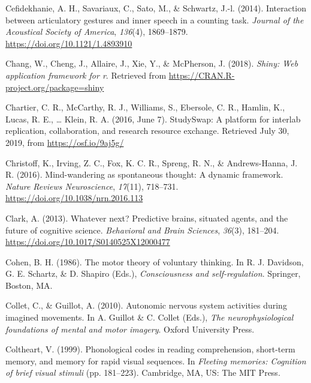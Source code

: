 \documentclass[a4paper,12pt,twoside,onecolumn,openright,final,oldfontcommands]{memoir}
\begin{document}
\leavevmode\hypertarget{ref-cefidekhanie_interaction_2014}{}%
Cefidekhanie, A. H., Savariaux, C., Sato, M., \& Schwartz, J.-l. (2014). Interaction between articulatory gestures and inner speech in a counting task. \emph{Journal of the Acoustical Society of America}, \emph{136}(4), 1869--1879. \url{https://doi.org/10.1121/1.4893910}

\leavevmode\hypertarget{ref-R-shiny}{}%
Chang, W., Cheng, J., Allaire, J., Xie, Y., \& McPherson, J. (2018). \emph{Shiny: Web application framework for r}. Retrieved from \url{https://CRAN.R-project.org/package=shiny}

\leavevmode\hypertarget{ref-chartier_studyswap_2016}{}%
Chartier, C. R., McCarthy, R. J., Williams, S., Ebersole, C. R., Hamlin, K., Lucas, R. E., \ldots{} Klein, R. A. (2016, June 7). StudySwap: A platform for interlab replication, collaboration, and research resource exchange. Retrieved July 30, 2019, from \url{https://osf.io/9aj5g/}

\leavevmode\hypertarget{ref-christoff_mind-wandering_2016}{}%
Christoff, K., Irving, Z. C., Fox, K. C. R., Spreng, R. N., \& Andrews-Hanna, J. R. (2016). Mind-wandering as spontaneous thought: A dynamic framework. \emph{Nature Reviews Neuroscience}, \emph{17}(11), 718--731. \url{https://doi.org/10.1038/nrn.2016.113}

\leavevmode\hypertarget{ref-clark_whatever_2013}{}%
Clark, A. (2013). Whatever next? Predictive brains, situated agents, and the future of cognitive science. \emph{Behavioral and Brain Sciences}, \emph{36}(3), 181--204. \url{https://doi.org/10.1017/S0140525X12000477}

\leavevmode\hypertarget{ref-cohen_motor_1986}{}%
Cohen, B. H. (1986). The motor theory of voluntary thinking. In R. J. Davidson, G. E. Schartz, \& D. Shapiro (Eds.), \emph{Consciousness and self-regulation}. Springer, Boston, MA.

\leavevmode\hypertarget{ref-collet_autonomic_2010}{}%
Collet, C., \& Guillot, A. (2010). Autonomic nervous system activities during imagined movements. In A. Guillot \& C. Collet (Eds.), \emph{The neurophysiological foundations of mental and motor imagery}. Oxford University Press.

\leavevmode\hypertarget{ref-coltheart_phonological_1999}{}%
Coltheart, V. (1999). Phonological codes in reading comprehension, short-term memory, and memory for rapid visual sequences. In \emph{Fleeting memories: Cognition of brief visual stimuli} (pp. 181--223). Cambridge, MA, US: The MIT Press.
\end{document}
